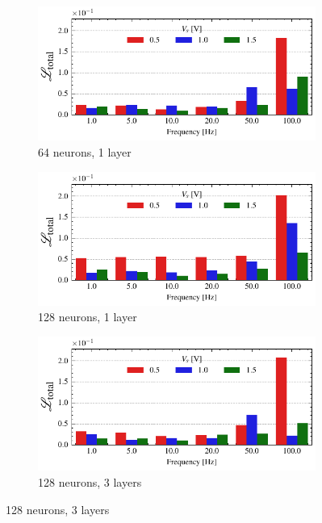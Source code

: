 \documentclass[11pt, oneside]{article}
\begin{document}
\begin{figure}
    \begin{subfigure}[c]{0.48\linewidth}
        \centering
        \includegraphics[width=\linewidth]{sample_results/loss_per_freq_model_silu_64_1best_cpu.pdf}
        \caption{64 neurons, 1 layer}
    \end{subfigure}
    \begin{subfigure}[c]{0.48\linewidth}
        \centering
        \includegraphics[width=\linewidth]{sample_results/loss_per_freq_model_silu_128_1best_cpu.pdf}
        \caption{128 neurons, 1 layer}
    \end{subfigure}
    \begin{subfigure}[c]{0.48\linewidth}
        \centering
        \includegraphics[width=\linewidth]{sample_results/loss_per_freq_model_silu_128_3best_cpu.pdf}
        \caption{128 neurons, 3 layers}


\end{subfigure}
\end{figure}
\end{document}
